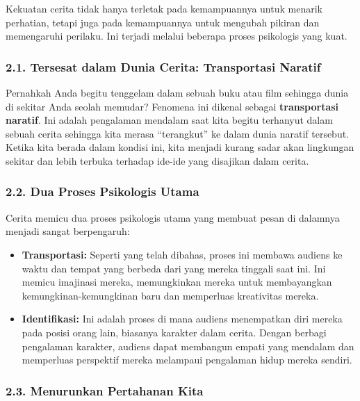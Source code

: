 \documentclass[
  letterpaper,
  DIV=11,
  numbers=noendperiod]{scrreprt}
\begin{document}
Kekuatan cerita tidak hanya terletak pada kemampuannya untuk menarik
perhatian, tetapi juga pada kemampuannya untuk mengubah pikiran dan
memengaruhi perilaku. Ini terjadi melalui beberapa proses psikologis
yang kuat.

\subsubsection{2.1. Tersesat dalam Dunia Cerita: Transportasi
Naratif}\label{tersesat-dalam-dunia-cerita-transportasi-naratif}

Pernahkah Anda begitu tenggelam dalam sebuah buku atau film sehingga
dunia di sekitar Anda seolah memudar? Fenomena ini dikenal sebagai
\textbf{transportasi naratif}. Ini adalah pengalaman mendalam saat kita
begitu terhanyut dalam sebuah cerita sehingga kita merasa ``terangkut''
ke dalam dunia naratif tersebut. Ketika kita berada dalam kondisi ini,
kita menjadi kurang sadar akan lingkungan sekitar dan lebih terbuka
terhadap ide-ide yang disajikan dalam cerita.

\subsubsection{2.2. Dua Proses Psikologis
Utama}\label{dua-proses-psikologis-utama}

Cerita memicu dua proses psikologis utama yang membuat pesan di dalamnya
menjadi sangat berpengaruh:

\begin{itemize}
\item
  \textbf{Transportasi:} Seperti yang telah dibahas, proses ini membawa
  audiens ke waktu dan tempat yang berbeda dari yang mereka tinggali
  saat ini. Ini memicu imajinasi mereka, memungkinkan mereka untuk
  membayangkan kemungkinan-kemungkinan baru dan memperluas kreativitas
  mereka.
\item
  \textbf{Identifikasi:} Ini adalah proses di mana audiens menempatkan
  diri mereka pada posisi orang lain, biasanya karakter dalam cerita.
  Dengan berbagi pengalaman karakter, audiens dapat membangun empati
  yang mendalam dan memperluas perspektif mereka melampaui pengalaman
  hidup mereka sendiri.
\end{itemize}

\subsubsection{2.3. Menurunkan Pertahanan
Kita}\label{menurunkan-pertahanan-kita}
\end{document}
